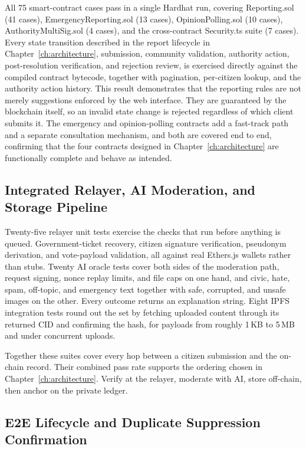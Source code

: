 All 75 smart-contract cases pass in a single Hardhat run, covering {Reporting.sol} (41 cases), {EmergencyReporting.sol} (13 cases),    {OpinionPolling.sol} (10 cases), {AuthorityMultiSig.sol} (4 cases), and the cross-contract {Security.ts} suite (7 cases). Every state transition described in the report lifecycle in Chapter~\ref{ch:architecture}, submission, community validation, authority action, post-resolution verification, and rejection review, is exercised directly against the compiled contract bytecode, together with pagination, per-citizen lookup, and the authority action history. This result demonstrates that the reporting rules are not merely suggestions enforced by the web interface. They are guaranteed by the blockchain itself, so an invalid state change is rejected regardless of which client submits it. The emergency and opinion-polling contracts add a fast-track path and a separate consultation mechanism, and both are covered end to end, confirming that the four contracts designed in Chapter~\ref{ch:architecture} are functionally complete and behave as intended.

\subsection{Integrated Relayer, AI Moderation, and Storage Pipeline}

Twenty-five relayer unit tests exercise the checks that run before anything is queued. Government-ticket recovery, citizen signature verification, pseudonym derivation, and vote-payload validation, all against real Ethers.js wallets rather than stubs. Twenty AI oracle tests cover both sides of the moderation path, request signing, nonce replay limits, and file caps on one hand, and civic, hate, spam, off-topic, and emergency text together with safe, corrupted, and unsafe images on the other. Every outcome returns an explanation string. Eight \ac{IPFS} integration tests round out the set by fetching uploaded content through its returned \ac{CID} and confirming the hash, for payloads from roughly 1\,KB to 5\,MB and under concurrent uploads.

Together these suites cover every hop between a citizen submission and the on-chain record. Their combined pass rate supports the ordering chosen in Chapter~\ref{ch:architecture}. Verify at the relayer, moderate with AI, store off-chain, then anchor on the private ledger.

\subsection{\ac{E2E} Lifecycle and Duplicate Suppression Confirmation}

